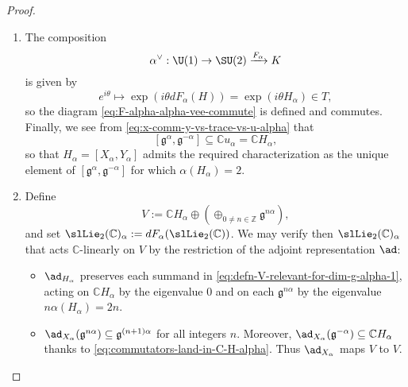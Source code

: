 \documentclass[reqno]{amsart} 
\begin{document}
\begin{proof}
\begin{enumerate}
    This completes the proof that the linear map ``$d F_\alpha$'' defines a $\theta$-equivariant $\mathbb{C}$-linear Lie algebra morphism $\slLie_2(\mathbb{C}) \rightarrow \mathfrak{g}$.  By passage to $\theta$-fixed subspaces, we obtain a Lie algebra morphism $\su(2) \rightarrow \mathfrak{k}$.  Since $\SU(2)$ is simply-connected, this lifts to a Lie group morphism $F_\alpha : K \rightarrow \SU(2)$, whose differential $d F_\alpha$ is the map ``$d F_\alpha$'' that we constructed.
  \item The composition
    \begin{equation*}
      \alpha^\vee : \U(1) \rightarrow \SU(2)
      \xrightarrow{F_\alpha } K
    \end{equation*}
    is given by
    \begin{equation*}
      e^{i \theta}
      \mapsto
      \exp (i \theta d F_\alpha(H))
      =
      \exp(i \theta H_\alpha)
      \in T,
    \end{equation*}
    so the diagram \eqref{eq:F-alpha-alpha-vee-commute} is defined and commutes.  Finally, we see from \eqref{eq:x-comm-y-vs-trace-vs-u-alpha} that
    \begin{equation}\label{eq:commutators-land-in-C-H-alpha}
      [\mathfrak{g}^\alpha, \mathfrak{g}^{-\alpha}]
      \subseteq \mathbb{C} u_\alpha
      = \mathbb{C} H_\alpha,
    \end{equation}
    so that $H_\alpha = [X_\alpha, Y_\alpha]$ admits the required characterization as the unique element of $[\mathfrak{g}^\alpha, \mathfrak{g}^{-\alpha}]$ for which $\alpha(H_\alpha) = 2$.
  \item Define
    \begin{equation}\label{eq:defn-V-relevant-for-dim-g-alpha-1}
      V := \mathbb{C} H_\alpha \oplus (\oplus_{0 \neq n \in
        \mathbb{Z} }
      \mathfrak{g}^{n \alpha}),
    \end{equation}
    and set $\slLie_2(\mathbb{C})_\alpha := d F_\alpha(\slLie_2(\mathbb{C}))$.  We may verify then $\slLie_2(\mathbb{C})_\alpha$ that acts $\mathbb{C}$-linearly on $V$ by the restriction of the adjoint representation $\ad$:
    \begin{itemize}
    \item $\ad_{H_\alpha}$ preserves each summand in \eqref{eq:defn-V-relevant-for-dim-g-alpha-1}, acting on $\mathbb{C} H_\alpha$ by the eigenvalue $0$ and on each $\mathfrak{g}^{n \alpha}$ by the eigenvalue $n \alpha(H_\alpha) = 2 n$.
    \item $\ad_{X_\alpha}(\mathfrak{g}^{n \alpha}) \subseteq \mathfrak{g}^{(n+1) \alpha}$ for all integers $n$.  Moreover, $\ad_{X_\alpha}(\mathfrak{g}^{-\alpha}) \subseteq \mathbb{C} H_\alpha$ thanks to \eqref{eq:commutators-land-in-C-H-alpha}.  Thus $\ad_{X_\alpha}$ maps $V$ to $V$.

\end{itemize}
\end{enumerate}
\end{proof}
\end{document}
